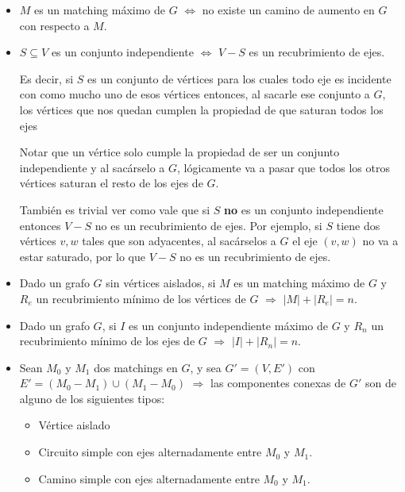 \begin{itemize}
\item $M$ es un matching m\'aximo de $G$ $\Leftrightarrow$ no existe un camino de aumento en $G$ con respecto a $M$.
\item $S \subseteq V$ es un conjunto independiente $\Leftrightarrow$ $V - S$ es un recubrimiento de ejes.

Es decir, si $S$ es un conjunto de v\'ertices para los cuales todo eje es incidente con como mucho uno de esos v\'ertices entonces, al sacarle ese conjunto a $G$, los v\'ertices que nos quedan cumplen la propiedad de que saturan todos los ejes

Notar que un v\'ertice solo cumple la propiedad de ser un conjunto independiente y al sac\'arselo a $G$, l\'ogicamente va a pasar que todos los otros v\'ertices saturan el resto de los ejes de $G$.

Tambi\'en es trivial ver como vale que si $S$ \textbf{no} es un conjunto independiente entonces $V - S$ no es un recubrimiento de ejes. Por ejemplo, si $S$ tiene dos v\'ertices $v,w$ tales que son adyacentes, al sac\'arselos a $G$ el eje $(v,w)$ no va a estar saturado, por lo que $V - S$ no es un recubrimiento de ejes.

\item Dado un grafo $G$ sin v\'ertices aislados, si $M$ es un matching m\'aximo de $G$ y $R_e$ un recubrimiento m\'inimo de los v\'ertices de $G$ $\Rightarrow$ $|M| + |R_e| = n$.
\item Dado un grafo $G$, si $I$ es un conjunto independiente m\'aximo de $G$ y $R_n$ un recubrimiento m\'inimo de los ejes de $G$ $\Rightarrow$ $|I| + |R_n| = n$.

\newpage
\item Sean $M_0$ y $M_1$ dos matchings en $G$, y sea $G' = (V, E')$ con $E' = (M_0 - M_1) \cup (M_1 - M_0)$ $\Rightarrow$ las componentes conexas de $G'$ son de alguno de los siguientes tipos:

\begin{itemize}
\item V\'ertice aislado
\item Circuito simple con ejes alternadamente entre $M_0$ y $M_1$.
\item Camino simple con ejes alternadamente entre $M_0$ y $M_1$.
\end{itemize}

\begin{figure}[htb]
    \centering
    
\end{figure}

\end{itemize}


